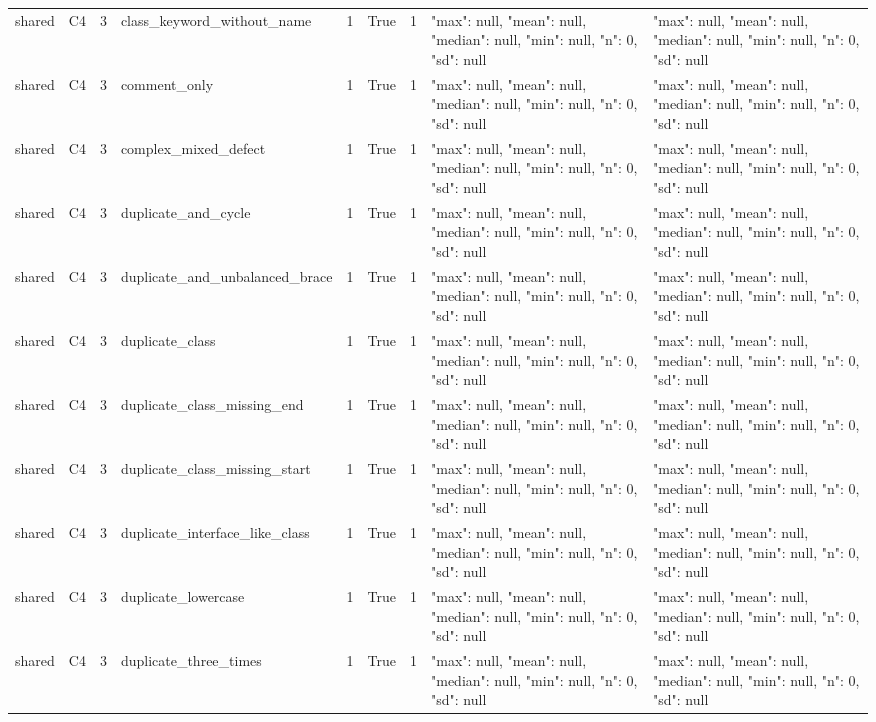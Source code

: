 \begin{tabular}{lllllllll}
shared & C4 & 3 & class\_keyword\_without\_name & 1 & True & 1 & {"max": null, "mean": null, "median": null, "min": null, "n": 0, "sd": null} & {"max": null, "mean": null, "median": null, "min": null, "n": 0, "sd": null} \\
shared & C4 & 3 & comment\_only & 1 & True & 1 & {"max": null, "mean": null, "median": null, "min": null, "n": 0, "sd": null} & {"max": null, "mean": null, "median": null, "min": null, "n": 0, "sd": null} \\
shared & C4 & 3 & complex\_mixed\_defect & 1 & True & 1 & {"max": null, "mean": null, "median": null, "min": null, "n": 0, "sd": null} & {"max": null, "mean": null, "median": null, "min": null, "n": 0, "sd": null} \\
shared & C4 & 3 & duplicate\_and\_cycle & 1 & True & 1 & {"max": null, "mean": null, "median": null, "min": null, "n": 0, "sd": null} & {"max": null, "mean": null, "median": null, "min": null, "n": 0, "sd": null} \\
shared & C4 & 3 & duplicate\_and\_unbalanced\_brace & 1 & True & 1 & {"max": null, "mean": null, "median": null, "min": null, "n": 0, "sd": null} & {"max": null, "mean": null, "median": null, "min": null, "n": 0, "sd": null} \\
shared & C4 & 3 & duplicate\_class & 1 & True & 1 & {"max": null, "mean": null, "median": null, "min": null, "n": 0, "sd": null} & {"max": null, "mean": null, "median": null, "min": null, "n": 0, "sd": null} \\
shared & C4 & 3 & duplicate\_class\_missing\_end & 1 & True & 1 & {"max": null, "mean": null, "median": null, "min": null, "n": 0, "sd": null} & {"max": null, "mean": null, "median": null, "min": null, "n": 0, "sd": null} \\
shared & C4 & 3 & duplicate\_class\_missing\_start & 1 & True & 1 & {"max": null, "mean": null, "median": null, "min": null, "n": 0, "sd": null} & {"max": null, "mean": null, "median": null, "min": null, "n": 0, "sd": null} \\
shared & C4 & 3 & duplicate\_interface\_like\_class & 1 & True & 1 & {"max": null, "mean": null, "median": null, "min": null, "n": 0, "sd": null} & {"max": null, "mean": null, "median": null, "min": null, "n": 0, "sd": null} \\
shared & C4 & 3 & duplicate\_lowercase & 1 & True & 1 & {"max": null, "mean": null, "median": null, "min": null, "n": 0, "sd": null} & {"max": null, "mean": null, "median": null, "min": null, "n": 0, "sd": null} \\
shared & C4 & 3 & duplicate\_three\_times & 1 & True & 1 & {"max": null, "mean": null, "median": null, "min": null, "n": 0, "sd": null} & {"max": null, "mean": null, "median": null, "min": null, "n": 0, "sd": null} \\

\end{tabular}
